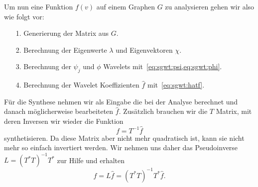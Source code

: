 Um nun eine Funktion $f(v)$ auf einem Graphen $G$ zu analysieren gehen wir 
also wie folgt vor:
\begin{itemize}
    \item[1.] Generierung der \laplaceL{} Matrix aus $G$.
    \item[2.] Berechnung der Eigenwerte $\lambda$ und Eigenvektoren $\chi$.
    \item[3.] Berechnung der $\psi_j$ und $\phi$ Wavelets 
    mit~\cref{eq:sgwt:psi,eq:sgwt:phi}.
    \item[4.] Berechnung der Wavelet Koeffizienten $\hat{f}$ 
    mit~\cref{eq:sgwt:hatf}.
\end{itemize}

F\"ur die Synthese nehmen wir als Eingabe die bei der Analyse berechnet und 
danach m\"oglicherweise bearbeiteten $\hat{f}$. Zus\"atzlich brauchen wir die 
$T$ Matrix, mit deren Inversen wir wieder die Funktion
\begin{equation}
f = T^{-1} \hat{f}
\end{equation}
synthetisieren. Da diese Matrix aber nicht mehr quadratisch ist, kann sie nicht 
mehr so einfach invertiert werden. Wir nehmen uns daher das Pseudoinverse $L = 
(T^*T)^{-1}T^*$ zur Hilfe und erhalten
\begin{equation}
f = L \hat{f} = (T^*T)^{-1}T^* \hat{f}.
\end{equation}
